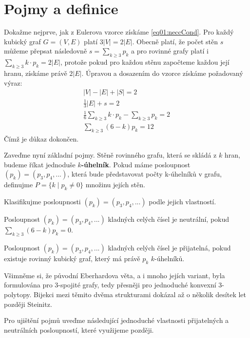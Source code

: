 
\chapter{Pojmy a definice}

Dokažme nejprve, jak z Eulerova vzorce získáme \eqref{eq01:neccCond}. Pro každý kubický graf $G = (V,E)$ platí $3 |V| = 2 |E|$. Obecně platí, že počet stěn $s$ můžeme přepsat následovně $s = \sum_{k \geq 3}{p_k}$ a pro rovinné grafy platí i $ \sum_{k \geq 3}{k \cdot p_k}= 2|E|$, protože pokud pro každou stěnu započteme každou její hranu, získáme právě $2|E|$. Úpravou a dosazením do vzorce získáme požadovaný výraz: 
\begin{align*}
|V|-|E|+|S|=2 \\ \frac{1}{3} |E| + s = 2 \\
\frac{1}{6} \sum_{k \geq 3}{k \cdot p_k} - \sum_{k \geq 3}{p_k} = 2 \\ 
\sum_{k \geq 3}{(6-k)p_k}=12
\end{align*}
Čímž je důkaz dokončen.

Zaveďme nyní základní pojmy. Stěně rovinného grafu, která se skládá z $k$ hran, budeme říkat jednoduše \textbf{$k$-úhelník}. Pokud máme posloupnost $(p_k) = (p_3,p_4,...)$, která bude představovat počty k-úhelníků v grafu, definujme $P = \lbrace k \mid p_k \neq 0 \rbrace$ množinu jejích stěn.

Klasifikujme posloupnosti $(p_k) = (p_3,p_4,...)$ podle jejich vlastností.

\begin{definice}\label{def01:neutralni}
Posloupnost $(p_k) = (p_3,p_4,...)$ kladných celých čísel je neutrální, pokud $\sum_{k \geq 3}{(6-k)p_k}=0$.
\end{definice}

\begin{definice}\label{def01:prijatelna}
Posloupnost $(p_k) = (p_3,p_4,...)$ kladných celých čísel je přijatelná, pokud existuje rovinný kubický graf, který má právě $p_k$ $k$-úhelníků.
\end{definice}

Všimněme si, že původní Eberhardova věta, a i mnoho jejích variant, byla formulována pro 3-spojité grafy, tedy přesněji pro jednoduché konvexní 3-polytopy. Bijekci mezi těmito dvěma strukturami dokázal až o několik desítek let později Steinitz.

Pro ujištění pojmů uveďme následující jednoduché vlastnosti přijatelných a neutrálních posloupností, které využijeme později.

